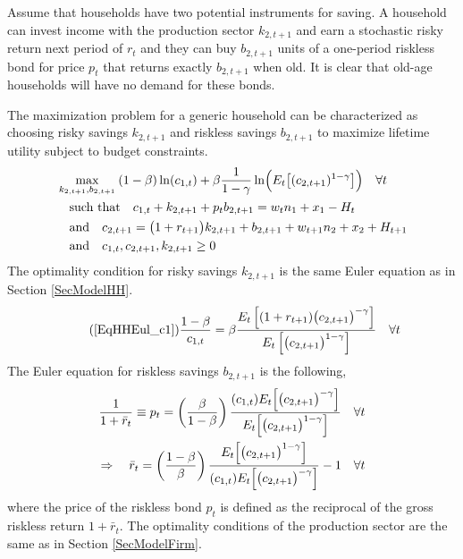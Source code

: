 \documentclass[letterpaper,12pt]{article}
\theoremstyle{definition}
\begin{document}
\begin{spacing}{1.5}
    Assume that households have two potential instruments for saving. A household can invest income with the production sector $k_{2,t+1}$ and earn a stochastic risky return next period of $r_t$ and they can buy $b_{2,t+1}$ units of a one-period riskless bond  for price $p_t$ that returns exactly $b_{2,t+1}$ when old. It is clear that old-age households will have no demand for these bonds.

    The maximization problem for a generic household can be characterized as choosing risky savings $k_{2,t+1}$ and riskless savings $b_{2,t+1}$ to maximize lifetime utility subject to budget constraints.
    \begin{align}
      &\max_{k_{2,t+1},b_{2,t+1}}\: (1-\beta)\ln(c_{1,t}) + \beta\frac{1}{1-\gamma}\ln\Bigl(E_t\bigl[(c_{2,t+1})^{1-\gamma}\bigr]\Bigr) \quad \forall t \label{EqModelRiskMaxUtil} \\
      &\quad\text{such that}\quad c_{1,t} + k_{2,t+1} + p_t b_{2,t+1} = w_t n_1 + x_1 - H_t \label{EqModelRisk_bc1} \\
      &\quad\text{and}\quad c_{2,t+1} = \bigl(1+r_{t+1}\bigr)k_{2,t+1} + b_{2,t+1} + w_{t+1}n_2 + x_2 + H_{t+1} \label{EqModelRisk_bc2} \\
      &\quad\text{and}\quad c_{1,t},c_{2,t+1},k_{2,t+1} \geq 0 \label{EqModelRisk_nonneg}
    \end{align}
    The optimality condition for risky savings $k_{2,t+1}$ is the same Euler equation as in Section \ref{SecModelHH}.
    \begin{equation}\tag{\ref{EqHHEul_c1}}
       \frac{1-\beta}{c_{1,t}} = \beta \frac{E_t\left[(1 + r_{t+1})\bigl(c_{2,t+1}\bigr)^{-\gamma}\right]}{E_t\left[\bigl(c_{2,t+1}\bigr)^{1-\gamma}\right]} \quad\forall t
    \end{equation}
    The Euler equation for riskless savings $b_{2,t+1}$ is the following,
    \begin{equation}\label{EqModelRisk_rbart}
      \begin{split}
        \frac{1}{1 + \bar{r}_t} \equiv p_t = \left(\frac{\beta}{1-\beta}\right)\frac{(c_{1,t})E_t\Bigl[\bigl(c_{2,t+1}\bigr)^{-\gamma}\Bigr]}{E_t\Bigl[\bigl(c_{2,t+1}\bigr)^{1-\gamma}\Bigr]} \quad \forall t \\
        \Rightarrow\quad \bar{r}_t = \left(\frac{1-\beta}{\beta}\right)\frac{E_t\Bigl[\bigl(c_{2,t+1}\bigr)^{1-\gamma}\Bigr]}{(c_{1,t})E_t\Bigl[\bigl(c_{2,t+1}\bigr)^{-\gamma}\Bigr]} - 1 \quad\forall t
      \end{split}
    \end{equation}
    where the price of the riskless bond $p_t$ is defined as the reciprocal of the gross riskless return $1 + \bar{r}_t$. The optimality conditions of the production sector are the same as in Section \ref{SecModelFirm}.


\end{spacing}
\end{document}
